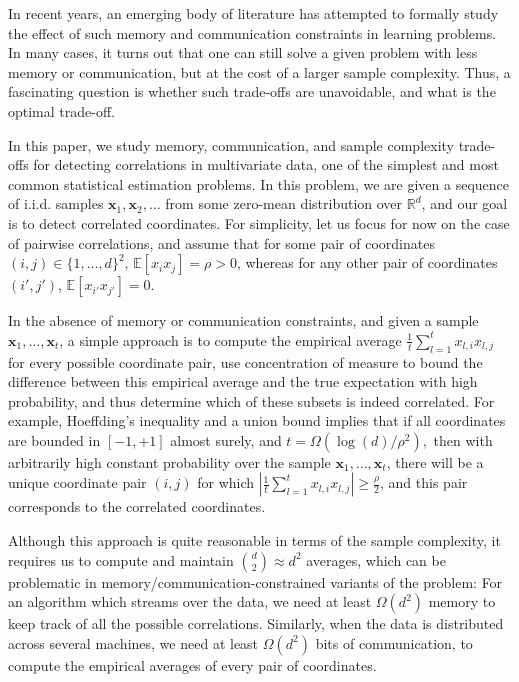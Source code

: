\documentclass[final, 12pt]{colt2018}
\newcommand{\reals}{\mathbb{R}}
\newcommand{\E}{\mathbb{E}}
\newcommand{\bx}{\mathbf{x}}
\begin{document}
In recent years, an emerging body of literature has attempted to formally study 
the effect of such memory and communication constraints in learning problems. In many cases, it turns out that one can still solve a given problem 
with less memory or communication, but at the cost of a larger sample 
complexity. Thus, a fascinating question is whether such trade-offs are 
unavoidable, and what is the optimal trade-off. 

In this paper, we study memory, communication, and sample complexity trade-offs for detecting correlations in multivariate data, one of the simplest and most common statistical estimation problems. In this problem, we are given a sequence of i.i.d. samples $\bx_1,\bx_2,\ldots$ from some zero-mean distribution over $\reals^d$, and our goal is to detect correlated coordinates. For simplicity, let us focus for now on the case of pairwise correlations, and assume that for some pair of coordinates $(i,j)\in\{1,\ldots,d\}^2$, $\E\left[x_i x_j\right]=\rho > 0$, whereas for any other pair of coordinates $(i',j')$, $\E\left[x_{i'}x_{j'}\right]=0$.

In the absence of memory or communication constraints, and given a sample 
$\bx_1,\ldots,\bx_t$, a simple approach is to compute the empirical average
$
\frac{1}{t}\sum_{l=1}^{t}x_{l,i}x_{l,j}
$
for every possible coordinate pair, use 
concentration of measure to bound the difference between this empirical average 
and the true expectation with high probability, and thus determine which 
of these subsets is indeed correlated. For example, Hoeffding's inequality and a union bound implies that if all coordinates are 
bounded in $[-1,+1]$ almost surely, and $
t= \Omega\left(\log(d)/\rho^2\right),
$
then with arbitrarily high constant probability over the sample 
$\bx_1,\ldots,\bx_t$, there will be a unique coordinate pair $(i,j)$ for which
$
\left|\frac{1}{t}\sum_{l=1}^{t}x_{l,i}x_{l,j}\right|\geq 
\frac{\rho}{2}
$,
and this pair corresponds to the correlated coordinates.

Although this approach is quite reasonable in terms of the sample complexity, it requires us to compute and maintain $\binom{d}{2}\approx d^2$ averages, which can be problematic in 
memory/communication-constrained variants of the problem: For an algorithm 
which streams over the data, we need at least $\Omega(d^2)$ memory to keep 
track of all the possible correlations. Similarly, when the data is distributed across several machines, we need at least $\Omega(d^2)$ bits of communication, to compute the empirical averages of every pair of coordinates.
\end{document}
